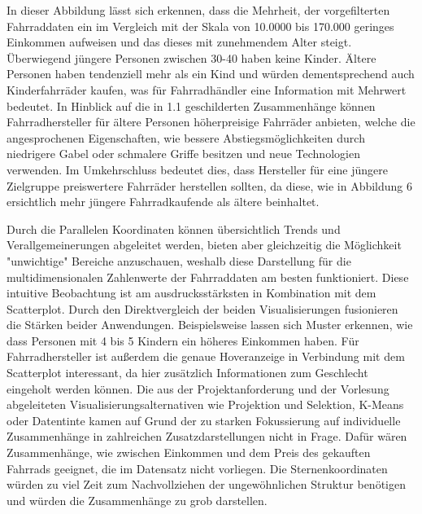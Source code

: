 \documentclass[usegeometry=true]{scrartcl}
\begin{document}
\newline In dieser Abbildung lässt sich erkennen, dass die Mehrheit, der vorgefilterten Fahrraddaten ein im Vergleich mit der Skala von 10.0000 bis 170.000 geringes Einkommen aufweisen und das dieses mit zunehmendem Alter steigt. Überwiegend jüngere Personen zwischen 30-40 haben keine Kinder. Ältere Personen haben tendenziell mehr als ein Kind und würden dementsprechend auch Kinderfahrräder kaufen, was für Fahrradhändler eine Information mit Mehrwert bedeutet. In Hinblick auf die in 1.1 geschilderten Zusammenhänge können Fahrradhersteller  für ältere Personen höherpreisige Fahrräder anbieten, welche die angesprochenen Eigenschaften, wie bessere Abstiegsmöglichkeiten durch niedrigere Gabel oder schmalere Griffe besitzen und neue Technologien verwenden.  Im Umkehrschluss bedeutet dies, dass Hersteller für eine jüngere Zielgruppe preiswertere Fahrräder herstellen sollten, da diese, wie in Abbildung 6 ersichtlich mehr jüngere Fahrradkaufende als ältere beinhaltet.  

Durch die Parallelen Koordinaten können übersichtlich Trends und Verallgemeinerungen abgeleitet werden, bieten aber gleichzeitig die Möglichkeit "unwichtige" Bereiche anzuschauen, weshalb diese Darstellung für die multidimensionalen Zahlenwerte der Fahrraddaten am besten funktioniert. Diese intuitive Beobachtung ist am ausdrucksstärksten in Kombination mit dem Scatterplot. Durch den Direktvergleich der beiden Visualisierungen fusionieren die Stärken beider Anwendungen. Beispielsweise lassen sich Muster erkennen, wie dass Personen mit 4 bis 5 Kindern ein höheres Einkommen haben. Für Fahrradhersteller ist außerdem die genaue Hoveranzeige in Verbindung mit dem Scatterplot interessant, da hier zusätzlich Informationen zum Geschlecht eingeholt werden können. Die aus der Projektanforderung und der Vorlesung abgeleiteten Visualisierungsalternativen wie Projektion und Selektion, K-Means oder Datentinte kamen auf Grund der zu starken Fokussierung auf individuelle Zusammenhänge in zahlreichen Zusatzdarstellungen nicht in Frage. Dafür wären Zusammenhänge, wie  zwischen Einkommen und dem Preis des gekauften Fahrrads geeignet, die im Datensatz nicht vorliegen. Die Sternenkoordinaten würden zu viel Zeit zum Nachvollziehen der ungewöhnlichen Struktur benötigen und würden die Zusammenhänge zu grob darstellen. 
\end{document}
